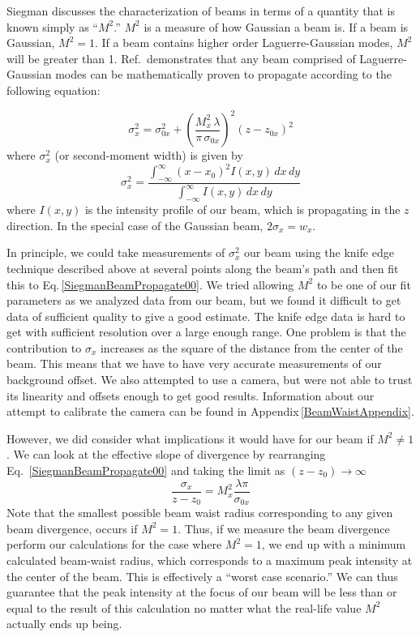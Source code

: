Siegman \cite{SiegmanBeamQuality} discusses the characterization of beams in terms of a quantity that is known simply as ``$M^2$.'' $M^2$ is a measure of how Gaussian a beam is. If a beam is Gaussian, $M^2=1$. If a beam contains higher order Laguerre-Gaussian modes, $M^2$ will be greater than 1. Ref.\,\cite{SiegmanBeamQuality} demonstrates that any beam comprised of Laguerre-Gaussian modes can be mathematically proven to propagate according to the following equation:

\begin{equation}
\sigma_x^2=\sigma_{0x}^2+\left( \frac{M_x^2 \,\lambda}{\pi \, \sigma_{0x}}\right)^2 (z-z_{0x})^2 \label{SiegmanBeamPropagate00}
\end{equation}
where $\sigma_x^2$ (or second-moment width) is given by 
\begin{equation}\label{secondMomentWidth}
\sigma_x^2=\frac{\int_{-\infty}^{\infty} (x-x_0)^2 I(x,y)\, dx\, dy}{\int_{-\infty}^{\infty} I(x,y)\, dx \, dy}
\end{equation} 
where $I(x,y)$ is the intensity profile of our beam, which is propagating in the $z$ direction. In the special case of the Gaussian beam, $2\sigma_x=w_x$.

In principle, we could take measurements of $\sigma_x^2$ our beam using the knife edge technique described above at several points along the beam's path and then fit this to Eq.\,\ref{SiegmanBeamPropagate00}.
We tried allowing $M^2$ to be one of our fit parameters as we analyzed data from our beam, but we found it difficult to get data of sufficient quality to give a good estimate. The knife edge data is hard to get with sufficient resolution over a large enough range. One problem is that the contribution to $\sigma_x$ increases as the square of the distance from the center of the beam. This means that we have to have very accurate measurements of our background offset. We also attempted to use a camera, but were not able to trust its linearity and offsets enough to get good results. Information about our attempt to calibrate the camera can be found in Appendix\,\ref{BeamWaistAppendix}. 

However, we did consider what implications it would have for our beam if $M^2\neq 1$. We can look at the effective slope of divergence by rearranging Eq.\ \ref{SiegmanBeamPropagate00} and taking the limit as $(z-z_0) \rightarrow \infty$
\begin{equation}
\frac{\sigma_x}{z-z_0}=M_x^2 \frac{\lambda \pi}{\sigma_{0x}} \label{SiegmanBeamSlope}
\end{equation}
Note that the smallest possible beam waist radius corresponding to any given beam divergence, occurs if $M^2=1$. Thus, if we measure the beam divergence perform our calculations for the case where $M^2=1$, we end up with a minimum calculated beam-waist radius, which corresponds to a maximum peak intensity at the center of the beam. This is effectively a ``worst case scenario.'' We can thus guarantee that the peak intensity at the focus of our beam will be less than or equal to the result of this calculation no matter what the real-life value $M^2$ actually ends up being. 


